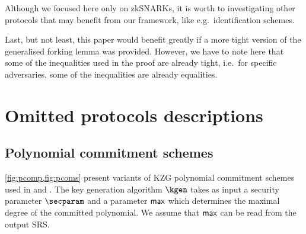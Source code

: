 \documentclass[runningheads,11pt]{llncs}
\begin{document}
Although we focused here only on zkSNARKs, it is worth to
investigating other protocols that may benefit from our framework, like
e.g.~identification schemes.

Last, but not least, this paper would benefit greatly if a more tight version
of the generalised forking lemma was provided. However, we have to note here
that some of the inequalities used in the proof are already tight, i.e.~for
specific adversaries, some of the inequalities are already equalities.




\appendix

\section{Omitted protocols descriptions}
\subsection{Polynomial commitment schemes}
\label{sec:pcom}
\cref{fig:pcomp,fig:pcoms} present variants of KZG polynomial commitment schemes
used in \plonk{} and \sonic{}. The key generation algorithm $\kgen$ takes as
input a security parameter $\secparam$ and a parameter $\mathsf{max}$ which
determines the maximal degree of the committed polynomial. We assume that
$\mathsf{max}$ can be read from the output SRS.
\end{document}
